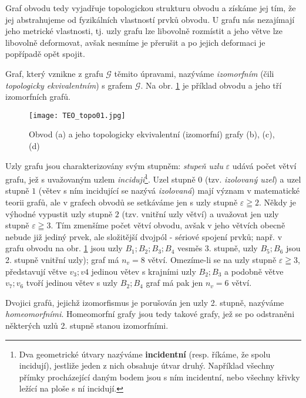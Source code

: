       Graf obvodu tedy vyjadřuje topologickou strukturu obvodu a získáme jej tím, že jej 
      abstrahujeme od fyzikálních vlastností prvků obvodu. U grafu nás nezajímají jeho metrické 
      vlastnosti, tj. uzly grafu lze libovolně rozmístit a jeho větve lze libovolně deformovat, 
      avšak nesmíme je přerušit a po jejich deformaci je popřípadě opět spojit.
      
      Graf, který vznikne z grafu \(\mathscr{G}\) těmito úpravami, nazýváme \emph{izomorfním} (čili 
      \emph{topologicky ekvivalentním}) s grafem \(\mathscr{G}\). Na obr. \ref{TEO:fig_topo01} je 
      příklad obvodu a jeho tří izomorfních grafů.
      
      \begin{figure}[ht!]
        \centering
        \texttt{[image: TEO\_topo01.jpg]}
        \caption{ Obvod (a) a jeho topologicky ekvivalentní (izomorfní) grafy (b), (c), (d) 
                  \cite[s.~39]{Meyer1978}}
        \label{TEO:fig_topo01}
      \end{figure}
      
      Uzly grafu jsou charakterizovány svým stupněm: \emph{stupeň uzlu} \(\varepsilon\) udává počet 
      větví grafu, jež s uvažovaným uzlem \emph{incidují}\footnote{Dva geometrické útvary nazýváme 
      \textbf{incidentní} (resp. říkáme, že spolu incidují), jestliže jeden z nich obsahuje útvar 
      druhý. Například všechny přímky procházející daným bodem jsou s ním incidentní, nebo všechny 
      křivky ležící na ploše s ní incidují.}. Uzel stupně \(0\) (tzv. \emph{izolovaný uzel}) a uzel 
      stupně \(1\) (větev s ním incidující se nazývá \emph{izolovaná}) mají význam v matematické 
      teorii grafů, ale v grafech obvodů se setkáváme jen s uzly stupně \(\varepsilon\geqq 2\). 
      Někdy je výhodné vypustit uzly stupně \(2\) (tzv. vnitřní uzly větví) a uvažovat jen uzly 
      stupně \(\varepsilon\geqq 3\). Tím zmenšíme počet větví obvodu, avšak v jeho větvích obecně 
      nebude již jediný prvek, ale složitější dvojpól - sériové spojení prvků; např. v grafu obvodu 
      na obr. \ref{TEO:fig_topo01} jsou uzly \(B_1; B_2; B_3; B_4\) vesměs 3. stupně, uzly \(B_5; 
      B_6\) jsou 2. stupně vnitřní uzly); graf má \(n_v = 8\) větví. Omezíme-li se na uzly stupně 
      \(\varepsilon\geqq 3\), představují větve \(v_3; v4\) jedinou větev s krajními uzly \(B_2; 
      B_3\) a podobně větve \(v_7; v_6\) tvoří jedinou větev s uzly \(B_2; B_4\) graf má pak jen 
      \(n_v = 6\) větví.
      
      Dvojici grafů, jejichž izomorfismus je porušován jen uzly 2. stupně, nazýváme 
      \emph{homeomorfními}. Homeomorfní grafy jsou tedy takové grafy, jež se po odstraněni 
      některých uzlů 2. stupně stanou izomorfními.
  
